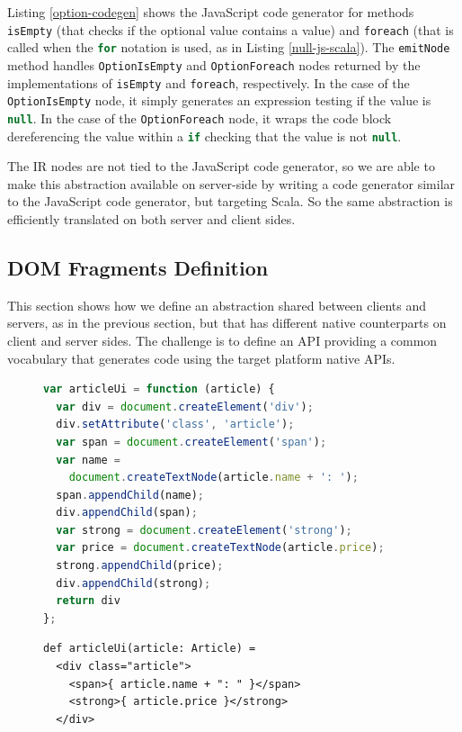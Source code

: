 \documentclass{llncs}
\newcommand{\code}[1]{\lstinline[language=Scala,columns=fixed,basicstyle=\footnotesize]|#1|}
\begin{document}
Listing \ref{option-codegen} shows the JavaScript code generator for methods \code{isEmpty} (that
checks if the optional value contains a value) and \code{foreach} (that is called when the
\code{for} notation is used, as in Listing \ref{null-js-scala}). The \code{emitNode} method handles
\code{OptionIsEmpty} and \code{OptionForeach} nodes returned by the implementations of
\code{isEmpty} and \code{foreach}, respectively. In the case of the \code{OptionIsEmpty} node, it
simply generates an expression testing if the value is \code{null}. In the case of the
\code{OptionForeach} node, it wraps the code block dereferencing the value within a \code{if}
checking that the value is not \code{null}.

The IR nodes are not tied to the JavaScript code generator, so we are able to make this abstraction
available on server-side by writing a code generator similar to the JavaScript code generator, but
targeting Scala. So the same abstraction is efficiently translated on both server and client sides.

\subsection{DOM Fragments Definition}
\label{sec:forest}

This section shows how we define an abstraction shared between clients and servers, as in the
previous section, but that has different native counterparts on client and server sides. The
challenge is to define an API providing a common vocabulary that generates code using the target
platform native APIs.

\begin{figure}[htb]
\begin{lstlisting}[language=JavaScript,caption=JavaScript DOM creation native API,label=dom-api]
var articleUi = function (article) {
  var div = document.createElement('div');
  div.setAttribute('class', 'article');
  var span = document.createElement('span');
  var name =
    document.createTextNode(article.name + ': ');
  span.appendChild(name);
  div.appendChild(span);
  var strong = document.createElement('strong');
  var price = document.createTextNode(article.price);
  strong.appendChild(price);
  div.appendChild(strong);
  return div
};
\end{lstlisting}
\end{figure}

\begin{figure}[htb]
\begin{lstlisting}[caption=Scala XML API,label=scala-xml-api]
def articleUi(article: Article) =
  <div class="article">
    <span>{ article.name + ": " }</span>
    <strong>{ article.price }</strong>
  </div>
\end{lstlisting}
\end{figure}
\end{document}
